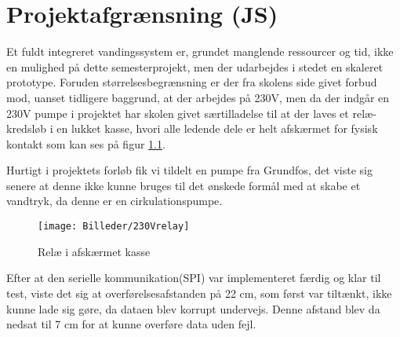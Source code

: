 \chapter{Projektafgrænsning (JS)}

Et fuldt integreret vandingssystem er, grundet manglende ressourcer og tid, ikke en mulighed på dette semesterprojekt, men der udarbejdes i stedet en skaleret prototype.
Foruden størrelsesbegrænsning er der fra skolens side givet forbud mod, uanset tidligere baggrund, at der arbejdes på 230V, men da der indgår en 230V pumpe i projektet har skolen givet særtilladelse til at der laves et relæ-kredsløb i en lukket kasse, hvori alle ledende dele er helt afskærmet for fysisk kontakt som kan ses på figur \ref{lab:230Vrelay}.

Hurtigt i projektets forløb fik vi tildelt en pumpe fra Grundfos, det viste sig senere at denne ikke kunne bruges til det ønskede formål med at skabe et vandtryk, da denne er en cirkulationspumpe. 


\begin{figure}[H]
  \centering
    \texttt{[image: Billeder/230Vrelay]}
    \caption{Relæ i afskærmet kasse}
    \label{lab:230Vrelay}
\end{figure}

Efter at den serielle kommunikation(SPI) var implementeret færdig og klar til test, viste det sig at overførelsesafstanden på 22 cm, som først var tiltænkt, ikke kunne lade sig gøre, da dataen blev korrupt undervejs. Denne afstand blev da nedsat til 7 cm for at kunne overføre data uden fejl.
 


